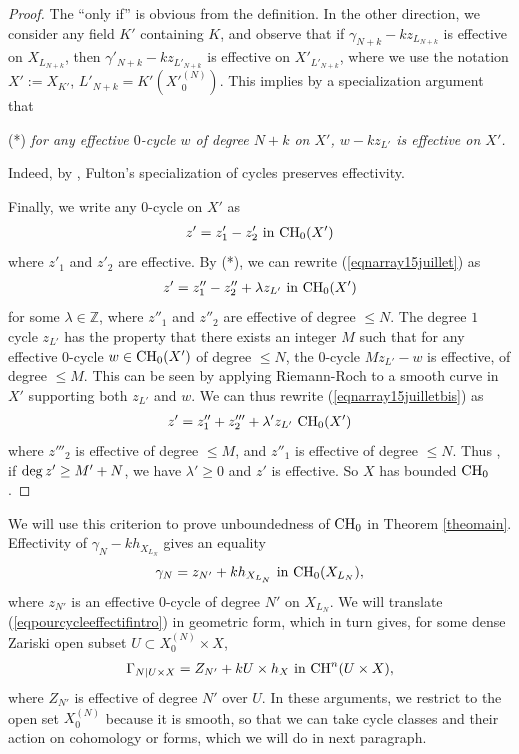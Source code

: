 \documentclass[10pt]{article}
\begin{document}
\begin{proof} The ``only if'' is obvious from the definition. In the other direction, we consider any  field $K'$ containing $K$, and observe that if  $\gamma_{N+k}-k z_{L_{N+k}}$ is effective on $X_{L_{N+k}}$, then $\gamma'_{N+k}-k z_{L'_{N+k}}$ is effective on $X'_{L'_{N+k}}$, where we use the notation $X':=X_{K'}$, $L'_{N+k}=K'({X'}^{(N)}_0)$. This implies by a specialization argument that

 (*) {\it for any effective $0$-cycle $w$ of degree $N+k$ on $X'$, $w-k z_{L'}$ is effective on $X'$.}

 Indeed, by  \cite[Lemme 2.10]{colliot}, Fulton's specialization of cycles \cite[10.3]{fulton} preserves effectivity.

Finally, we write any $0$-cycle on $X'$ as
\begin{eqnarray}\label{eqnarray15juillet}  z'=z'_1-z'_2\,\,{\rm in}\,\,{\rm CH}_0(X')
\end{eqnarray}
where $z'_1$ and $z'_2$ are effective.  By (*), we can rewrite (\ref{eqnarray15juillet}) as
\begin{eqnarray}\label{eqnarray15juilletbis}  z'=z''_1-z''_2+\lambda z_{L'}\,\,{\rm in}\,\,{\rm CH}_0(X')
\end{eqnarray}
for some $\lambda\in \mathbb{Z}$, where $z''_1$ and $z''_2$ are effective of degree $\leq N$.  The degree $1$ cycle $z_{L'}$ has the property that there exists an integer $M$ such that for any effective $0$-cycle $w\in {\rm CH}_0(X')$ of degree $\leq N$, the $0$-cycle
$M z_{L'}-w$ is effective, of degree $\leq M$. This can be seen by applying Riemann-Roch to a smooth curve in $X'$ supporting both $z_{L'}$ and $w$. We can thus rewrite  (\ref{eqnarray15juilletbis})
as
\begin{eqnarray}\label{eqnarray15juilletter}  z'=z''_1+z'''_2+\lambda' z_{L'}\,\,{\rm CH}_0(X')
\end{eqnarray}
where $z'''_2$ is effective of degree $\leq M$, and $z''_1$ is effective of degree $\leq N$. Thus , if ${\rm deg}\,z'\geq M'+N$, we have $\lambda'\geq 0$ and $z'$ is effective. So $X$ has bounded ${\rm CH}_0$.
\end{proof}

 We will use this  criterion  to prove unboundedness of ${\rm CH}_0$ in Theorem \ref{theomain}. Effectivity of $\gamma_{N}-k h_{X_{L_{N}}}$ gives an equality
\begin{eqnarray}\label{eqpourcycleeffectifintro}  \gamma_{N}=z_{N'}+ k h_{X_{L_{N}}}\,\,{\rm in}\,\, {\rm CH}_0(X_{L_{N}}),
\end{eqnarray}
where $z_{N'}$ is an effective $0$-cycle of degree $N'$ on $X_{L_{N}}$. We will translate (\ref{eqpourcycleeffectifintro})
 in geometric form,
which in turn gives, for some dense Zariski open subset $U\subset X^{(N)}_0\times X$,
\begin{eqnarray}\label{eqpourcycleeffectifintroetalee}  \Gamma_{N\mid U\times X}=Z_{N'}+ k U\times h_X\,\,{\rm in}\,\, {\rm CH}^n(U\times X),
\end{eqnarray}
where $Z_{N'}$ is effective of degree $N'$ over $U$.
 In these arguments, we restrict to the open set $X^{(N)}_0$ because it is smooth, so that we can take cycle classes and their action on cohomology or forms, which we will do in  next  paragraph.
\end{document}
